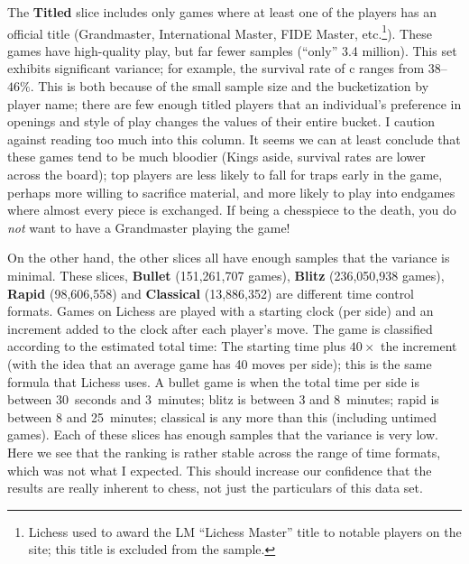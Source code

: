 \documentclass[twocolumn]{article}
\begin{document}
The {\bf Titled} slice includes only games where at least one of the
players has an official title (Grandmaster, International Master, FIDE
Master, etc.\footnote{Lichess used to award the LM ``Lichess Master''
  title to notable players on the site; this title is excluded from
  the sample.}). These games have high-quality play, but far fewer
samples (``only'' 3.4 million). This set exhibits significant
variance; for example, the survival rate of \pawn c ranges from
$38$--$46\%$. This is both because of the small sample size and the
bucketization by player name; there are few enough titled players that
an individual's preference in openings and style of play changes the
values of their entire bucket. I caution against reading too much into
this column. It seems we can at least conclude that these games tend
to be much bloodier (Kings aside, survival rates are lower across the
board); top players are less likely to fall for traps early in the
game, perhaps more willing to sacrifice material, and more likely to
play into endgames where almost every piece is exchanged. If being a
chesspiece to the death, you do {\em not} want to have a Grandmaster
playing the game!


On the other hand, the other slices all have enough samples that the
variance is minimal. These slices, {\bf Bullet} (151,261,707 games),
{\bf Blitz} (236,050,938 games), {\bf Rapid} (98,606,558) and {\bf
  Classical} (13,886,352) are different time control formats. Games on
Lichess are played with a starting clock (per side) and an increment
added to the clock after each player's move. The game is classified
according to the estimated total time: The starting time plus $40 \times$
the increment (with the idea that an average game has 40 moves per
side); this is the same formula that Lichess uses. A bullet game is
when the total time per side is between 30~seconds and 3~minutes;
blitz is between 3 and 8~minutes; rapid is between 8 and 25~minutes;
classical is any more than this (including untimed games). Each of
these slices has enough samples that the variance is very low.
Here we see that the ranking is rather stable across the range of
time formats, which was not what I expected. This should increase
our confidence that the results are really inherent to chess, not
just the particulars of this data set.



{}

\end{document}
